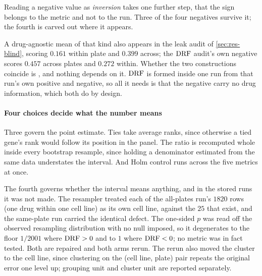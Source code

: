 Reading a negative value as \emph{inversion} takes one further step, that the
sign belongs to the metric and not to the run. Three of the four negatives survive it; the
fourth is carved out where it appears.

A drug-agnostic mean of that kind also appears in the leak audit of
\cref{sec:res-blind}, scoring $0.161$ within plate and $0.399$ across; the
$\textrm{DRF}$ audit's own negative scores $0.457$ across plates and $0.272$ within.
Whether the two constructions coincide is , and nothing
depends on it. $\textrm{DRF}$ is formed inside one run from that run's own positive and
negative, so all it needs is that the negative carry no drug information, which
both do by design.

\paragraph{Four choices decide what the number means} Three govern the point
estimate. Ties take average ranks, since otherwise a tied gene's rank would
follow its position in the panel. The ratio is recomputed whole inside every bootstrap
resample, since holding a denominator estimated from the same data understates
the interval. And Holm control runs across the five metrics at once.

The fourth governs whether the interval means anything, and in the stored runs
it was not made. The resampler treated each of the all-plates run's $\num{1820}$ rows (one
drug within one cell line) as its own cell line, against the $25$ that exist,
and the same-plate run carried the identical defect. The one-sided $p$ was read
off the observed resampling distribution with no null imposed, so it degenerates
to the floor $1/2001$ where $\textrm{DRF} > 0$ and to $1$ where $\textrm{DRF} < 0$; no metric
was in fact tested. Both are repaired and both arms rerun. The rerun
also moved the cluster to the cell line, since clustering on the (cell
line, plate) pair repeats the original error one level up; grouping unit and
cluster unit are reported separately.


